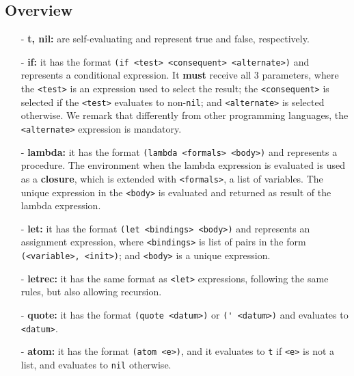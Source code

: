 \documentclass[10pt, english]{article}
\begin{document}


\subsection{Overview}

\begin{itemize}
  \item[-] \textbf{t, nil:} are self-evaluating and represent true and false, respectively.
  \item[-] \textbf{if:} it has the format \verb|(if <test> <consequent> <alternate>)| and represents a conditional expression. It \textbf{must} receive all 3 parameters, where the \verb|<test>| is an expression used to select the result; the \verb|<consequent>| is selected if the \verb|<test>| evaluates to non-\verb|nil|; and \verb|<alternate>| is selected otherwise. We remark that differently from other programming languages, the \verb|<alternate>| expression is mandatory.
  \item[-] \textbf{lambda:} it has the format \verb|(lambda <formals> <body>)| and represents a procedure. The environment when the lambda expression is evaluated is used as a \textbf{closure}, which is extended with \verb|<formals>|, a list of variables. The unique expression in the \verb|<body>| is evaluated and returned as result of the lambda expression.
  \item[-] \textbf{let:} it has the format \verb|(let <bindings> <body>)| and represents an assignment expression, where \verb|<bindings>| is list of  pairs in the form \verb|(<variable>, <init>)|; and \verb|<body>| is a unique expression.
  \item[-] \textbf{letrec:} it has the same format as \verb|<let>| expressions, following the same rules, but also allowing recursion.
  \item[-] \textbf{quote:} it has the format \verb|(quote <datum>)| or \verb|(' <datum>)| and evaluates to \verb|<datum>|.
  \item[-] \textbf{atom:} it has the format \verb|(atom <e>)|, and it evaluates to \verb|t| if \verb|<e>| is not a list, and evaluates to \verb|nil| otherwise.

\end{itemize}
\end{document}
